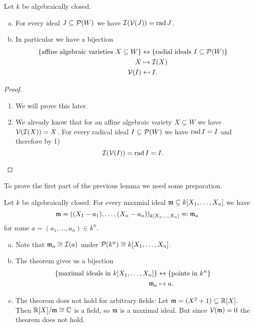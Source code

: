 \begin{prop}
 Let $k$ be algebraically closed.
 \begin{enumerate}[a)]
  \item
  For every ideal $J \subseteq \mathcal{P}(W)$ we have $\mathcal{I}(\mathcal{V}(J)) = \operatorname{rad} J$.
  \item
  In particular we have a bijection
  \begin{align*}
   \{\text{affine algebraic varieties $X \subseteq W$}\} &\leftrightarrow \{\text{radial ideals $I \subseteq \mathcal{P}(W)$}\} \\
           X &\mapsto \mathcal{I}(X) \\
   \mathcal{V}(I) &\mapsfrom I.
  \end{align*}
 \end{enumerate}
\end{prop}
\begin{proof}
 \begin{enumerate}
  \item
  We will prove this later.
  \item
  We already know that for an affine algebraic variety $X \subseteq W$ we have $\mathcal{V}(\mathcal{I}(X)) = X$. For every radical ideal $I \subseteq \mathcal{P}(W)$ we have $\operatorname{rad} I = I$ and therefore by 1)
  \[
   \mathcal{I}(\mathcal{V}(I)) = \operatorname{rad} I = I.
  \]
 \end{enumerate}
\end{proof}


To prove the first part of the previous lemma we need some preparation.


\begin{thrm}
 Let $k$ be algebraically closed. For every maxmial ideal \mbox{$\mathfrak{m} \subseteq k[X_1, \dotsc, X_n]$} we have
 \[
  \mathfrak{m} = ((X_1 - a_1), \dotsc, (X_n - a_n))_{k[X_1, \dotsc, X_n]} \eqqcolon \mathfrak{m}_a
 \]
 for some $a = (a_1, \dotsc, a_n) \in k^n$.
\end{thrm}


\begin{rem}
 \begin{enumerate}[a)]
  \item
  Note that $\mathfrak{m}_{a} \cong \mathcal{I}(a)$ under $\mathcal{P}(k^n) \cong k[X_1, \dotsc, X_n]$.
  \item
  The theorem gives us a bijection
  \begin{align*}
   \{\text{maximal ideals in $k[X_1, \dotsc, X_n]$}\} &\leftrightarrow \{\text{points in $k^n$}\} \\
   \mathfrak{m}_a &\mapsto a.
  \end{align*}
  \item
  The theorem does not hold for arbitrary fields: Let \mbox{$\mathfrak{m} = (X^2 + 1) \subseteq \mathbb{R}[X]$}. Then $\mathbb{R}[X]/\mathfrak{m} \cong \mathbb{C}$ is a field, so $\mathfrak{m}$ is a maximal ideal. But since $\mathcal{V}(\mathfrak{m}) = 0$ the theorem does not hold.
 \end{enumerate}
\end{rem}


